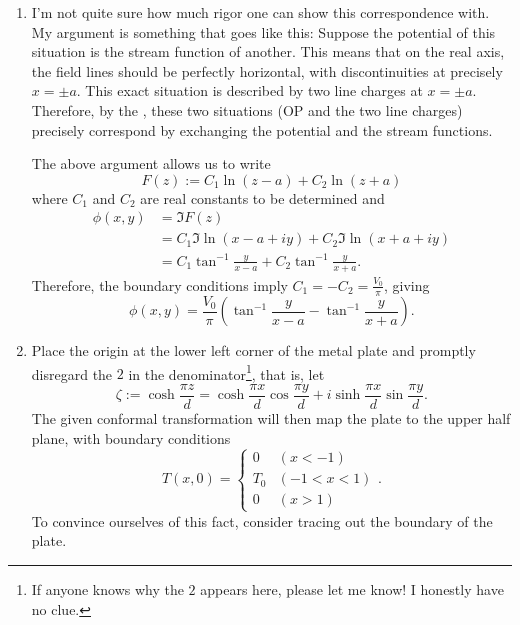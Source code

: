 \item

\begin{enumerate}[wide, labelindent = 0pt, label = (\alph*)]
\item
I'm not quite sure how much rigor one can show this correspondence with.
My argument is something that goes like this:
Suppose the potential of this situation is the stream function of another.
This means that on the real axis, the field lines should be perfectly horizontal,
with discontinuities at precisely $x = \pm a$.
This exact situation is described by two line charges at $x = \pm a$.
Therefore, by the ,
these two situations (OP and the two line charges) precisely correspond
by exchanging the potential and the stream functions.

The above argument allows us to write
\[
    F(z) := C_1 \ln (z - a) + C_2 \ln (z + a)
\]
where $C_1$ and $C_2$ are real constants to be determined and
\begin{align*}
    \phi(x, y)
    &= \Im F(z) \\
    &= C_1 \Im \ln(x - a + iy) + C_2 \Im \ln(x + a + iy) \\
    &= C_1 \tan^{-1} \frac{y}{x - a} + C_2 \tan^{-1} \frac{y}{x + a}.
\end{align*}
Therefore, the boundary conditions imply $C_1 = -C_2 = \frac{V_0}{\pi}$, giving
\[
    \phi(x, y)
    = \frac{V_0}{\pi} \left( \tan^{-1} \frac{y}{x - a} - \tan^{-1} \frac{y}{x + a} \right).
\]

\item
Place the origin at the lower left corner of the metal plate
and promptly disregard the $2$ in the denominator\footnote{%
If anyone knows why the $2$ appears here, please let me know!
I honestly have no clue.
}, that is, let
\[
    \zeta
    := \cosh \frac{\pi z}{d}
    = \cosh\frac{\pi x}{d} \cos\frac{\pi y}{d} + i\sinh\frac{\pi x}{d} \sin\frac{\pi y}{d}.
\]
The given conformal transformation will then map the plate to the upper half plane,
with boundary conditions
\[
    T(x, 0) = \begin{cases}
        0   & (x < -1) \\
        T_0 & (-1< x < 1) \\
        0   & (x > 1)
    \end{cases}.
\]
To convince ourselves of this fact, consider tracing out the boundary of the plate.


\end{enumerate}
